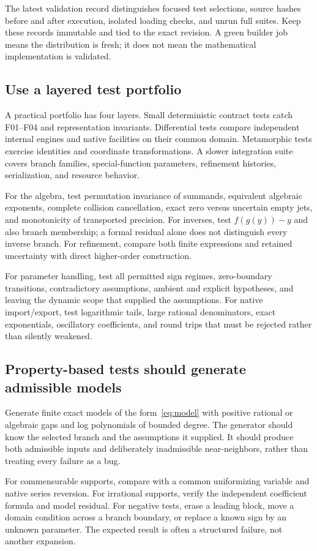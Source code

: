 \documentclass[11pt,a4paper]{article}
\begin{document}
The latest validation record distinguishes focused test selections, source hashes before and after execution, isolated loading checks, and unrun full suites. Keep these records immutable and tied to the exact revision. A green builder job means the distribution is fresh; it does not mean the mathematical implementation is validated.

\subsection{Use a layered test portfolio}
A practical portfolio has four layers. Small deterministic contract tests catch F01--F04 and representation invariants. Differential tests compare independent internal engines and native facilities on their common domain. Metamorphic tests exercise identities and coordinate transformations. A slower integration suite covers branch families, special-function parameters, refinement histories, serialization, and resource behavior.

For the algebra, test permutation invariance of summands, equivalent algebraic exponents, complete collision cancellation, exact zero versus uncertain empty jets, and monotonicity of transported precision. For inverses, test $f(g(y))-y$ and also branch membership; a formal residual alone does not distinguish every inverse branch. For refinement, compare both finite expressions and retained uncertainty with direct higher-order construction.

For parameter handling, test all permitted sign regimes, zero-boundary transitions, contradictory assumptions, ambient and explicit hypotheses, and leaving the dynamic scope that supplied the assumptions. For native import/export, test logarithmic tails, large rational denominators, exact exponentials, oscillatory coefficients, and round trips that must be rejected rather than silently weakened.

\subsection{Property-based tests should generate admissible models}
Generate finite exact models of the form~\eqref{eq:model} with positive rational or algebraic gaps and log polynomials of bounded degree. The generator should know the selected branch and the assumptions it supplied. It should produce both admissible inputs and deliberately inadmissible near-neighbors, rather than treating every failure as a bug.

For commensurable supports, compare with a common uniformizing variable and native series reversion. For irrational supports, verify the independent coefficient formula and model residual. For negative tests, erase a leading block, move a domain condition across a branch boundary, or replace a known sign by an unknown parameter. The expected result is often a structured failure, not another expansion.
\end{document}
